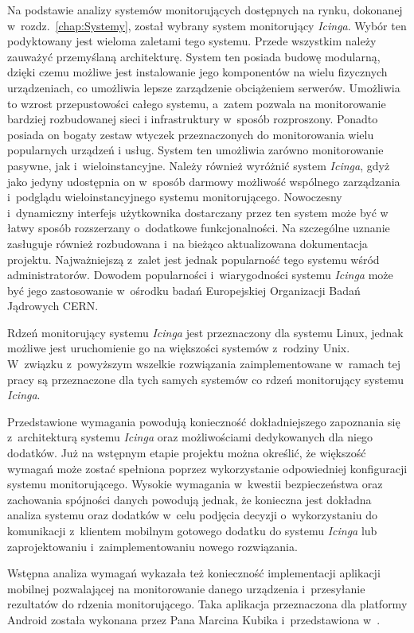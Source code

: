 Na podstawie analizy systemów monitorujących dostępnych na rynku,
dokonanej w~rozdz.~\ref{chap:Systemy}, został wybrany system
monitorujący {\em Icinga}. Wybór ten podyktowany jest wieloma zaletami tego
systemu. Przede wszystkim należy zauważyć przemyślaną
architekturę. System ten posiada budowę modularną, dzięki czemu
możliwe jest instalowanie jego komponentów na wielu fizycznych
urządzeniach, co umożliwia lepsze zarządzenie obciążeniem
serwerów. Umożliwia to wzrost przepustowości całego systemu, a~zatem
pozwala na monitorowanie bardziej rozbudowanej sieci i infrastruktury
w~sposób rozproszony. Ponadto posiada on bogaty zestaw wtyczek
przeznaczonych do monitorowania wielu popularnych urządzeń i
usług. System ten umożliwia zarówno monitorowanie pasywne, jak
i~wieloinstancyjne. Należy również wyróżnić system {\em Icinga}, gdyż jako
jedyny udostępnia on w~sposób darmowy możliwość wspólnego zarządzania
i~podglądu wieloinstancyjnego systemu monitorującego. Nowoczesny
i~dynamiczny interfejs użytkownika dostarczany przez ten system może
być w łatwy sposób rozszerzany o~dodatkowe funkcjonalności. Na
szczególne uznanie zasługuje również rozbudowana i~na bieżąco
aktualizowana dokumentacja projektu. Najważniejszą z~zalet jest jednak
popularność tego systemu wśród administratorów. Dowodem popularności
i~wiarygodności systemu {\em Icinga} może być jego zastosowanie w~ośrodku
badań Europejskiej Organizacji Badań Jądrowych
CERN\cite{www:IcingaCern}.

Rdzeń monitorujący systemu {\em Icinga} jest przeznaczony dla systemu Linux,
jednak możliwe jest uruchomienie go na większości systemów z~rodziny
Unix. W~związku z~powyższym wszelkie rozwiązania zaimplementowane
w~ramach tej pracy są przeznaczone dla tych samych systemów co rdzeń
monitorujący systemu {\em Icinga}.

Przedstawione wymagania powodują konieczność dokładniejszego
zapoznania się z~architekturą systemu {\em Icinga} oraz możliwościami
dedykowanych dla niego dodatków. Już na wstępnym etapie projektu można
określić, że większość wymagań może zostać spełniona poprzez
wykorzystanie odpowiedniej konfiguracji systemu
monitorującego. Wysokie wymagania w~kwestii bezpieczeństwa oraz
zachowania spójności danych powodują jednak, że konieczna jest
dokładna analiza systemu oraz dodatków w~celu podjęcia decyzji
o~wykorzystaniu do komunikacji z~klientem mobilnym gotowego dodatku do
systemu {\em Icinga} lub zaprojektowaniu i~zaimplementowaniu nowego
rozwiązania.

Wstępna analiza wymagań wykazała też konieczność implementacji
aplikacji mobilnej pozwalającej na monitorowanie danego urządzenia
i~przesyłanie rezultatów do rdzenia monitorującego. Taka aplikacja
przeznaczona dla platformy Android została wykonana przez Pana Marcina
Kubika i~przedstawiona w~\cite{book:pracaKubika}.

